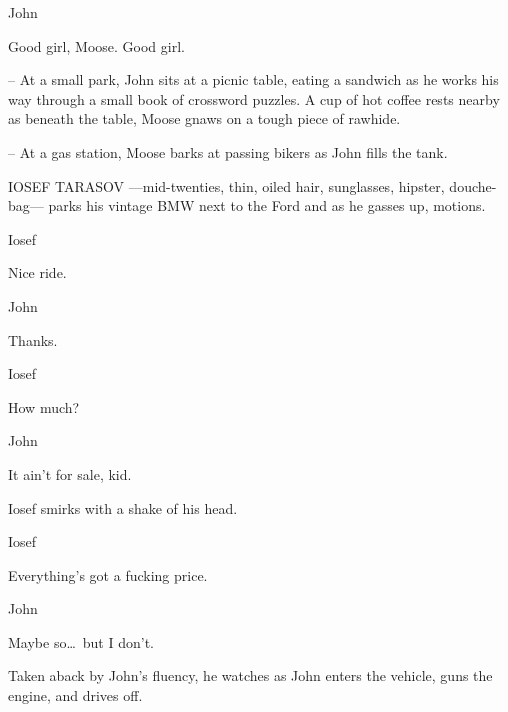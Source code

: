 \documentclass[letterpaper,literary]{screenwriter}
\begin{document}
\begin{dialogue}{John \contd}

    Good girl, Moose.  Good girl.

\end{dialogue}

-- At a small park, John sits at a picnic table, eating a sandwich as he
works his way through a small book of crossword puzzles.  A cup of hot
coffee rests nearby as beneath the table, Moose gnaws on a tough piece
of rawhide.

-- At a gas station, Moose barks at passing bikers as John fills the
tank.

IOSEF TARASOV ---mid-twenties, thin, oiled hair, sunglasses, hipster,
douche-bag--- parks his vintage BMW next to the Ford and as he gasses
up, motions.

\begin{dialogue}{Iosef}

    Nice ride.

\end{dialogue}

\begin{dialogue}{John}

    Thanks.

\end{dialogue}

\begin{dialogue}{Iosef}

    How much?

\end{dialogue}

\begin{dialogue}{John}

    It ain't for sale, kid.

\end{dialogue}

Iosef smirks with a shake of his head.

\begin{dialogue}{Iosef}

    Everything's got a fucking price.

\end{dialogue}

\begin{dialogue}{John}

    Maybe so\dots\ but I don't.

\end{dialogue}

Taken aback by John's fluency, he watches as John enters the vehicle,
guns the engine, and drives off.
\end{document}
